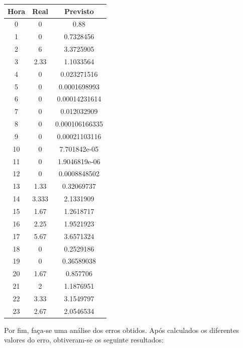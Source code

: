 \documentclass[a4paper, 12pt]{article}
\begin{document}
\begin{table}[H]
	\centering
	\begin{tabular}{||c||c|c||}
		\hline\hline
		Hora & Real&Previsto\\
		\hline\hline
		0 & 0

 &0.88 \\
		\hline
		1  &
0 & 0.7328456\\
		\hline
		2 & 6 & 	3.3725905\\
		\hline
		3  & 
2.33
 &1.1033564 \\
		\hline
		4 & 
0 & 0.023271516\\
		\hline
		5  & 
0 &0.0001698993 \\
		\hline
		6 & 
0
 & 
0.00014231614
 \\
		\hline
		7 & 0

 &0.012032909 \\
		\hline
		8  &0
 &0.000106166335 \\
		\hline
		9 &  0& 0.00021103116	\\
		\hline
		10 & 0

 & 7.701842e-05\\
		\hline
		11  &0
 & 1.9046819e-06\\
		\hline
		12 &0  & 0.0008848502	\\
		\hline
		13  & 
1.33
 &0.32069737 \\
		\hline
		14 & 
3.333 &2.1331909\\
		\hline
		15  & 1.67
 & 1.2618717\\
		\hline
		16 & 
2.25
 & 
1.9521923
 \\
		\hline
		17 & 
5.67
 & 3.6571324\\
		\hline
		18  &
0 &0.2529186 \\
		\hline
		19 &  0& 0.36589038	\\
		\hline
		20 & 
1.67
 &0.857706 \\
		\hline
		21  &
2 & 1.1876951\\
		\hline
		22 &  3.33& 3.1549797	\\
		\hline
		23  & 
2.67 
 &2.0546534 \\
		\hline\hline
	\end{tabular}
\end{table}

Por fim, faça-se uma análise dos erros obtidos. Após calculados os diferentes valores do erro, obtiveram-se os seguinte resultados:
\end{document}
